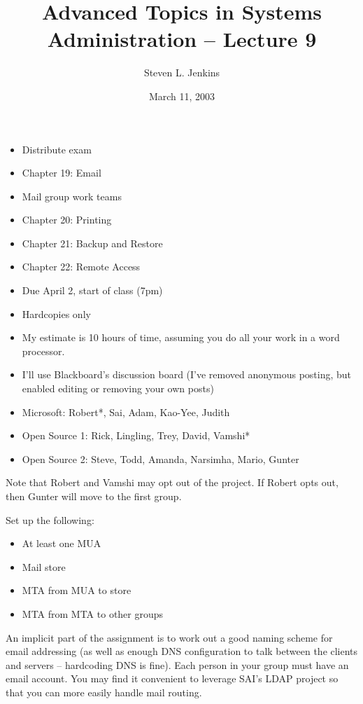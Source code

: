 \documentclass{slides}
\title{Advanced Topics in Systems Administration -- Lecture 9}
\author{Steven L. Jenkins}
\date{March 11, 2003}
\newcommand{\bi}{\begin{itemize}}
\newcommand{\ei}{\end{itemize}}
\begin{document}
\maketitle


\bi
\item Distribute exam
\item Chapter 19: Email
\item Mail group work teams
\item Chapter 20: Printing
\item Chapter 21: Backup and Restore
\item Chapter 22: Remote Access
\ei


\bi
\item Due April 2, start of class (7pm)
\item Hardcopies only
\item My estimate is 10 hours of time, assuming you do all your
  work in a word processor.
\item I'll use Blackboard's discussion board (I've removed anonymous posting,
but enabled editing or removing your own posts)
\ei


\bi
\item Microsoft: Robert*, Sai, Adam, Kao-Yee, Judith
\item Open Source 1: Rick, Lingling, Trey, David, Vamshi*
\item Open Source 2: Steve, Todd, Amanda, Narsimha, Mario, Gunter
\ei

Note that Robert and Vamshi may opt out of the project.  If Robert opts
out, then Gunter will move to the first group.


Set up the following:

\bi
\item At least one MUA
\item Mail store
\item MTA from MUA to store
\item MTA from MTA to other groups 
\ei

An implicit part of the assignment is to work out a good naming scheme
for email addressing (as well as enough DNS configuration to talk
between the clients and servers -- hardcoding DNS is fine).  Each person 
in your group must have an email 
account.  You may find it convenient to leverage SAI's LDAP project 
so that you can more easily handle mail routing. 
\end{document}
